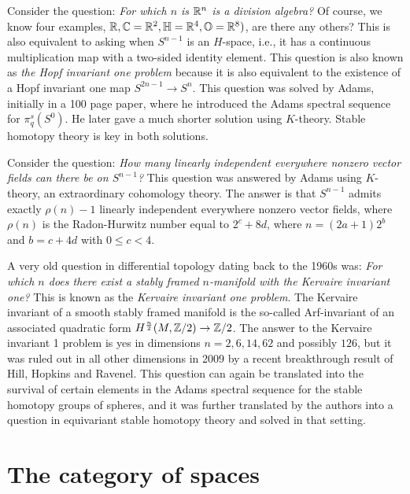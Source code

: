 \documentclass{article}[11pt]
\begin{document}
\begin{example} Consider the question: \emph{For which $n$ is $\mathbb{R}^n$ is a division algebra?} Of course, we know four examples, $\mathbb{R}, \mathbb{C}=\mathbb{R}^2, \mathbb{H}=\mathbb{R}^4, \mathbb{O}=\mathbb{R}^8)$, are there any others? This is also equivalent to asking when $S^{n-1}$ is an $H$-space, i.e., it has a continuous multiplication map with a two-sided identity element. This question is also known as \emph{the Hopf invariant one problem} because it is also equivalent to the existence of a Hopf invariant one map $S^{2n-1}\to S^n$. This question was  solved by Adams, initially in a 100 page paper, where he introduced the Adams spectral sequence for $\pi_q^s(S^0)$. He later gave a much shorter solution using $K$-theory. Stable homotopy theory is key in both solutions.
\end{example}

\begin{example} Consider the question: \emph{How many linearly independent everywhere nonzero vector fields can there be on $S^{n-1}$?} This question was answered by Adams using $K$-theory, an extraordinary cohomology theory. The answer is that $S^{n-1}$ admits exactly $\rho(n)-1$ linearly independent everywhere nonzero vector fields, where $\rho(n)$ is the Radon-Hurwitz number equal to $2^c+8d$, where $n=(2a+1)2^b$ and $b=c+4d$ with $0\leq c<4$.
\end{example}

\begin{example} A very old question in differential topology dating back to the 1960s was: \emph{For which $n$ does there exist a stably framed $n$-manifold with the Kervaire invariant one?} This is known as the \emph{Kervaire invariant one problem}. The Kervaire invariant of a smooth stably framed manifold is the so-called Arf-invariant of an associated quadratic form $H^{\frac{n}{2}}(M, \mathbb{Z}/2)\to\mathbb{Z}/2$. The answer to the Kervaire invariant 1 problem is yes in dimensions $n=2,6,14,62$ and possibly $126$, but it was ruled out in all other dimensions in 2009 by a recent breakthrough result of Hill, Hopkins and Ravenel. This question can again be translated into the survival of certain elements in the Adams spectral sequence for the stable homotopy groups of spheres, and it was further translated by the authors into a question in equivariant stable homotopy theory and solved in that setting.
\end{example}


\section{The category of spaces}
\end{document}

